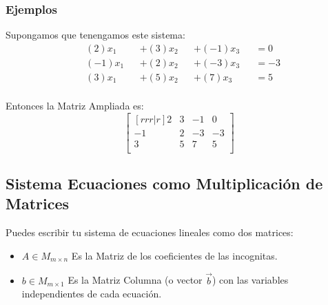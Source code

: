\documentclass[12pt]{report}                                    %
\begin{document}
                \subsubsection{Ejemplos}

                    Supongamos que tenengamos este sistema:
                    \begin{equation*}
                        \begin{split}
                            &(2)x_1  &&+  (3)x_2 &&+ (-1)x_3 &&= 0    \\
                            &(-1)x_1 &&+  (2)x_2 &&+ (-3)x_3 &&= -3   \\
                            &(3)x_1  &&+  (5)x_2 &&+ (7)x_3  &&= 5    \\
                        \end{split}
                    \end{equation*}

                    Entonces la Matriz Ampliada es:
                    \begin{equation*}
                        \begin{bmatrix}[rrr|r]
                            2  & 3 & -1 & 0  \\
                            -1 & 2 & -3 & -3 \\
                            3  & 5 & 7  & 5  \\
                        \end{bmatrix}
                    \end{equation*}


            \clearpage
            \subsection{Sistema Ecuaciones como Multiplicación de Matrices}

                Puedes escribir tu sistema de ecuaciones lineales como dos matrices:
                \begin{itemize}
                    \item $A \in M_{m \times n}$ Es la Matriz de los coeficientes de las incognitas.

                    \item $b \in M_{m \times 1}$ Es la Matriz Columna (o vector $\vec{b}$) con las variables 
                        independientes de cada ecuación.
                \end{itemize}
\end{document}
